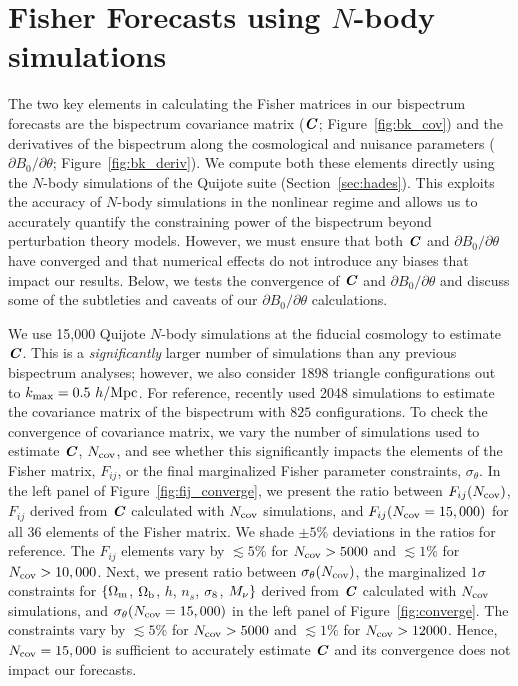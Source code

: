 \section{Fisher Forecasts using $N$-body simulations} \label{sec:numerical}
The two key elements in calculating the Fisher matrices in our bispectrum forecasts
are the bispectrum covariance matrix ($\textbf{\textit{C}}$; Figure~\ref{fig:bk_cov}) and 
the derivatives of the bispectrum along the cosmological and nuisance parameters 
($\partial B_0/\partial \theta$; Figure~\ref{fig:bk_deriv}). We compute 
both these elements directly using the $N$-body simulations of the Quijote suite 
(Section~\ref{sec:hades}). This exploits the accuracy of $N$-body simulations in 
the nonlinear regime and allows us to accurately quantify the constraining power of 
the bispectrum beyond perturbation theory models. However, we must ensure that 
both $\textbf{\textit{C}}$ and $\partial B_0/\partial \theta$ have converged and that numerical 
effects do not introduce any biases that impact our results. Below, we tests 
the convergence of $\textbf{\textit{C}}$ and $\partial B_0/\partial \theta$ and discuss
some of the subtleties and caveats of our $\partial B_0/\partial \theta$ 
calculations. 

We use 15,000 Quijote $N$-body simulations at the fiducial cosmology to 
estimate $\textbf{\textit{C}}$. This is a \emph{significantly} larger number of simulations 
than any previous bispectrum analyses; however, we also consider 1898 triangle 
configurations out to $k_{\rm max} = 0.5~h/{\rm Mpc}$. For reference, \cite{gil-marin2017} 
recently used 2048 simulations to estimate the covariance matrix of the 
bispectrum with $825$ configurations. To check the convergence of covariance 
matrix, we vary the number of simulations used to estimate $\textbf{\textit{C}}$, 
$N_{\rm cov}$, and see whether this significantly impacts the elements 
of the Fisher matrix, $F_{ij}$, or the final marginalized Fisher parameter 
constraints, $\sigma_\theta$. In the left panel of Figure~\ref{fig:fij_converge}, 
we present the ratio between $F_{ij}(N_{\rm cov})$, $F_{ij}$ derived from 
$\textbf{\textit{C}}$ calculated with $N_{\rm cov}$ simulations, and 
$F_{ij}(N_{\rm cov} = 15,000)$ for all 36 elements of the Fisher matrix. We 
shade $\pm5\%$ deviations in the ratios for reference. The $F_{ij}$ elements 
vary by $\lesssim 5\%$ for $N_{\rm cov} > 5000$ and $\lesssim 1\%$ for 
$N_{\rm cov} > 10,000$. Next, we present ratio between $\sigma_\theta(N_{\rm cov})$, 
the marginalized $1\sigma$ constraints for $\{\Omega_{\rm m}$, $\Omega_{\rm b}$, $h$, $n_s$, $\sigma_8$, $M_\nu\}$ 
derived from $\textbf{\textit{C}}$ calculated with $N_{\rm cov}$ simulations, and 
$\sigma_\theta(N_{\rm cov} = 15,000)$ in the left panel of Figure~\ref{fig:converge}. 
The constraints vary by $\lesssim 5\%$ for $N_{\rm cov} > 5000$ and $\lesssim 1\%$ 
for $N_{\rm cov} > 12000$. Hence, $N_{\rm cov} = 15,000$ is sufficient to 
accurately estimate $\textbf{\textit{C}}$ and its convergence does not impact our 
forecasts.

